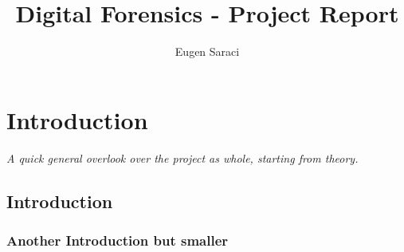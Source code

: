 \documentclass[a4paper,10pt]{report}
\title{Digital Forensics - Project Report}
\author{Eugen Saraci}
\begin{document}
\maketitle

\chapter{Introduction}
\label{ch:intro}

\noindent
\textit{A quick general overlook over the project as whole, starting from theory.}

\section{Introduction}


\subsection{Another Introduction but smaller}
\end{document}
